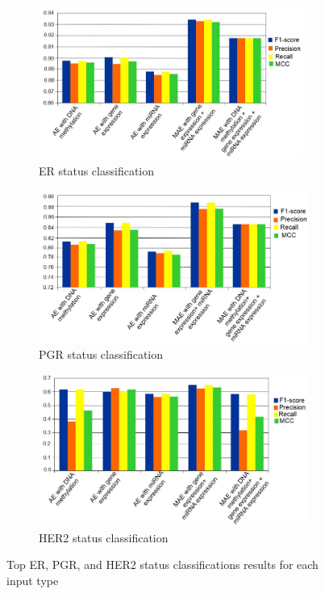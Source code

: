 \begin{figure}
	\centering
	\begin{subfigure}{.49\linewidth}
		\centering
		\includegraphics[width=0.9\linewidth,height=50mm]{images/1.png}
		\caption{ER status classification}
        \label{fig:top_er}
	\end{subfigure}
	\begin{subfigure}{.49\linewidth}
		\centering
		\includegraphics[width=0.9\linewidth,height=50mm]{images/2.png}
		\caption{PGR status classification}
        \label{fig:top_pgr}
	\end{subfigure}
	\begin{subfigure}{0.49\linewidth}
		\centering
		\includegraphics[width=0.9\linewidth,height=50mm]{images/3.png}
		\caption{HER2 status classification }
        \label{fig:top_her2}
	\end{subfigure}
	\caption{Top ER, PGR, and HER2 status classifications results for each input type~\cite{karimACCESS2019}} 
	\label{fig6}
		\vspace{-4mm} 
\end{figure}

